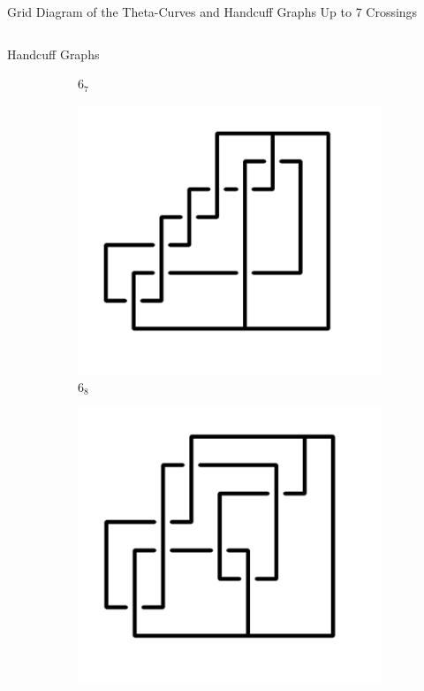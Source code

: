 \documentclass[final]{beamer}
\begin{document}
\begin{frame}[t]
\begin{alertblock}{Grid Diagram of the Theta-Curves and Handcuff Graphs Up to 7 Crossings}
\begin{columns}[t]
\begin{column}{0.5\textwidth}
\begin{alertblock}{Handcuff Graphs}
\begin{figure}
\begin{subfigure}{0.075\textwidth}
    \caption{$6_{7}$} 
    \end{subfigure}
    \begin{subfigure}{0.075\textwidth}
    \includegraphics[width=\columnwidth]{../Midterm_Poster/grid_diagram/handcuff_6_8.png}
    \caption{$6_{8}$} 
    \end{subfigure}
    \begin{subfigure}{0.075\textwidth}
    \includegraphics[width=\columnwidth]{../Midterm_Poster/grid_diagram/handcuff_6_9.png}

\end{subfigure}
\end{figure}
\end{alertblock}
\end{column}
\end{columns}
\end{alertblock}
\end{frame}
\end{document}
